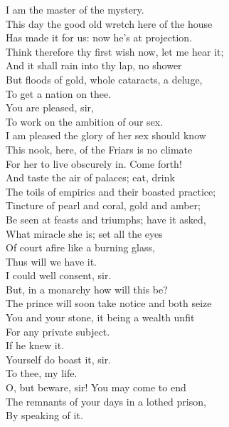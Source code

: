 \documentclass[a4paper,oneside,12pt]{memoir}
\begin{document}
\begin{drama*}
\mammonspeaks I am the master of the mystery.\\
This day the good old wretch here of the house\\
Has made it for us: now he's at projection.\\
Think therefore thy first wish now, let me hear it;\\
And it shall rain into thy lap, no shower\\
But floods of gold, whole cataracts, a deluge,\\
To get a nation on thee.\\
\dolspeaks {} You are pleased, sir,\\
To work on the ambition of our sex.\\
\mammonspeaks I am pleased the glory of her sex should know\\
This nook, here, of the Friars is no climate\\
For her to live obscurely in. Come forth!\\
And taste the air of palaces; eat, drink\\
The toils of empirics and their boasted practice;\\
Tincture of pearl and coral, gold and amber;\\
Be seen at feasts and triumphs; have it asked,\\
What miracle she is; set all the eyes\\
Of court afire like a burning glass,\\
Thus will we have it.\\
\dolspeaks {} I could well consent, sir.\\
But, in a monarchy how will this be?\\
The prince will soon take notice and both seize\\
You and your stone, it being a wealth unfit\\
For any private subject.\\
\mammonspeaks {} If he knew it.\\
\dolspeaks Yourself do boast it, sir.\\
\mammonspeaks {} To thee, my life.\\
\dolspeaks O, but beware, sir! You may come to end\\
The remnants of your days in a lothed prison,\\
By speaking of it.\\

\end{drama*}
\end{document}
